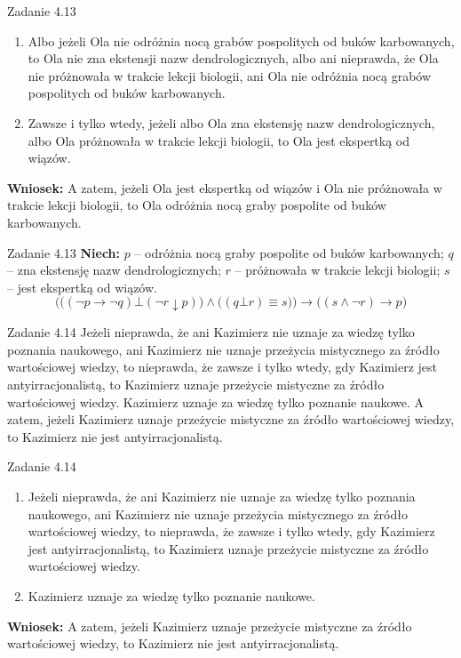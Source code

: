 \documentclass[12pt]{beamer}
\begin{document}
\begin{frame}{Zadanie 4.13}
\footnotesize
\begin{enumerate}
    \item[P1.] Albo jeżeli Ola nie odróżnia nocą grabów pospolitych od buków karbowanych, to Ola nie zna ekstensji nazw dendrologicznych, albo ani nieprawda, że Ola nie próżnowała w trakcie lekcji biologii, ani Ola nie odróżnia nocą grabów pospolitych od buków karbowanych.
    \item[P2.] Zawsze i tylko wtedy, jeżeli albo Ola zna ekstensję nazw dendrologicznych, albo Ola próżnowała w trakcie lekcji biologii, to Ola jest ekspertką od wiązów.
\end{enumerate}
\vspace{4pt}
\textbf{Wniosek:} A zatem, jeżeli Ola jest ekspertką od wiązów i Ola nie próżnowała w trakcie lekcji biologii, to Ola odróżnia nocą graby pospolite od buków karbowanych.
\end{frame}

\begin{frame}{Zadanie 4.13}
\small
\textbf{Niech:} $p$ -- odróżnia nocą graby pospolite od buków karbowanych; $q$ -- zna ekstensję nazw dendrologicznych; $r$ -- próżnowała w trakcie lekcji biologii; $s$ -- jest ekspertką od wiązów.
\vspace{10pt}
\[ \Big(\big((\neg p \rightarrow \neg q) \bot (\neg r \downarrow p)\big) \wedge \big((q \bot r) \equiv s\big)\Big) \rightarrow \big((s \wedge \neg r) \rightarrow p\big) \]
\end{frame}

\begin{frame}{Zadanie 4.14}
\footnotesize
Jeżeli nieprawda, że ani Kazimierz nie uznaje za wiedzę tylko poznania naukowego, ani Kazimierz nie uznaje przeżycia mistycznego za źródło wartościowej wiedzy, to nieprawda, że zawsze i tylko wtedy, gdy Kazimierz jest antyirracjonalistą, to Kazimierz uznaje przeżycie mistyczne za źródło wartościowej wiedzy. Kazimierz uznaje za wiedzę tylko poznanie naukowe. A zatem, jeżeli Kazimierz uznaje przeżycie mistyczne za źródło wartościowej wiedzy, to Kazimierz nie jest antyirracjonalistą.
\end{frame}

\begin{frame}{Zadanie 4.14}
\footnotesize
\begin{enumerate}
    \item[P1.] Jeżeli nieprawda, że ani Kazimierz nie uznaje za wiedzę tylko poznania naukowego, ani Kazimierz nie uznaje przeżycia mistycznego za źródło wartościowej wiedzy, to nieprawda, że zawsze i tylko wtedy, gdy Kazimierz jest antyirracjonalistą, to Kazimierz uznaje przeżycie mistyczne za źródło wartościowej wiedzy.
    \item[P2.] Kazimierz uznaje za wiedzę tylko poznanie naukowe.
\end{enumerate}
\vspace{4pt}
\textbf{Wniosek:} A zatem, jeżeli Kazimierz uznaje przeżycie mistyczne za źródło wartościowej wiedzy, to Kazimierz nie jest antyirracjonalistą.
\end{frame}
\end{document}
